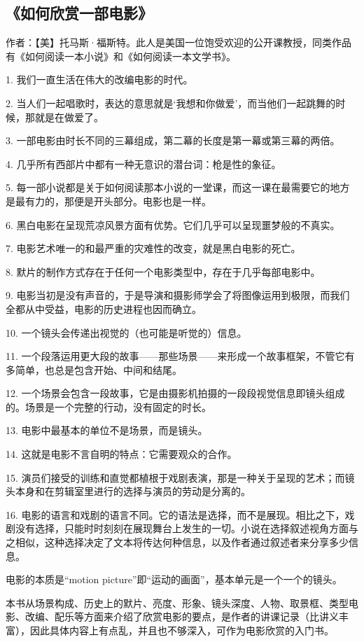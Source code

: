 \subsection{《如何欣赏一部电影》}

作者：【美】托马斯·福斯特。此人是美国一位饱受欢迎的公开课教授，同类作品有《如何阅读一本小说》和《如何阅读一本文学书》。

1. 我们一直生活在伟大的改编电影的时代。

2. 当人们一起唱歌时，表达的意思就是‘我想和你做爱’，而当他们一起跳舞的时候，那就是在做爱了。

3. 一部电影由时长不同的三幕组成，第二幕的长度是第一幕或第三幕的两倍。

4. 几乎所有西部片中都有一种无意识的潜台词：枪是性的象征。

5. 每一部小说都是关于如何阅读那本小说的一堂课，而这一课在最需要它的地方是最有力的，那便是开头部分。电影也是一样。

6. 黑白电影在呈现荒凉风景方面有优势。它们几乎可以呈现噩梦般的不真实。

7. 电影艺术唯一的和最严重的灾难性的改变，就是黑白电影的死亡。

8. 默片的制作方式存在于任何一个电影类型中，存在于几乎每部电影中。

9. 电影当初是没有声音的，于是导演和摄影师学会了将图像运用到极限，而我们全都从中受益，电影的历史进程也因而确立。

10. 一个镜头会传递出视觉的（也可能是听觉的）信息。

11. 一个段落运用更大段的故事——那些场景——来形成一个故事框架，不管它有多简单，也总是包含开始、中间和结尾。

12. 一个场景会包含一段故事，它是由摄影机拍摄的一段段视觉信息即镜头组成的。场景是一个完整的行动，没有固定的时长。

13. 电影中最基本的单位不是场景，而是镜头。

14. 这就是电影不言自明的特点：它需要观众的合作。

15. 演员们接受的训练和直觉都植根于戏剧表演，那是一种关于呈现的艺术；而镜头本身和在剪辑室里进行的选择与演员的劳动是分离的。

16. 电影的语言和戏剧的语言不同。它的语法是选择，而不是展现。相比之下，戏剧没有选择，只能时时刻刻在展现舞台上发生的一切。小说在选择叙述视角方面与之相似，这种选择决定了文本将传达何种信息，以及作者通过叙述者来分享多少信息。

电影的本质是“motion picture”即“运动的画面”，基本单元是一个一个的镜头。

本书从场景构成、历史上的默片、亮度、形象、镜头深度、人物、取景框、类型电影、改编、配乐等方面来介绍了欣赏电影的要点，是作者的讲课记录（比讲义丰富），因此具体内容上有点乱，并且也不够深入，可作为电影欣赏的入门书。